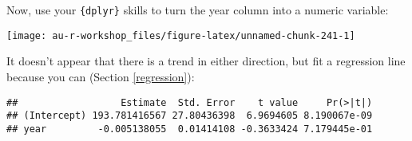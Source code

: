 \documentclass[]{book}
\newenvironment{Shaded}{\begin{snugshade}}{\end{snugshade}}
\newcommand{\KeywordTok}[1]{\textcolor[rgb]{0.13,0.29,0.53}{\textbf{#1}}}
\newcommand{\DataTypeTok}[1]{\textcolor[rgb]{0.13,0.29,0.53}{#1}}
\newcommand{\DecValTok}[1]{\textcolor[rgb]{0.00,0.00,0.81}{#1}}
\newcommand{\StringTok}[1]{\textcolor[rgb]{0.31,0.60,0.02}{#1}}
\newcommand{\CommentTok}[1]{\textcolor[rgb]{0.56,0.35,0.01}{\textit{#1}}}
\newcommand{\OperatorTok}[1]{\textcolor[rgb]{0.81,0.36,0.00}{\textbf{#1}}}
\newcommand{\NormalTok}[1]{#1}
\theoremstyle{definition}
\theoremstyle{definition}
\theoremstyle{definition}
\theoremstyle{remark}
\begin{document}
Now, use your \texttt{\{dplyr\}} skills to turn the year column into a
numeric variable:

\begin{Shaded}
\end{Shaded}

\begin{center}\texttt{[image: au-r-workshop\_files/figure-latex/unnamed-chunk-241-1]} \end{center}

It doesn't appear that there is a trend in either direction, but fit a
regression line because you can (Section \ref{regression}):

\begin{Shaded}
\end{Shaded}

\begin{verbatim}
##                  Estimate  Std. Error    t value     Pr(>|t|)
## (Intercept) 193.781416567 27.80436398  6.9694605 8.190067e-09
## year         -0.005138055  0.01414108 -0.3633424 7.179445e-01
\end{verbatim}
\end{document}

